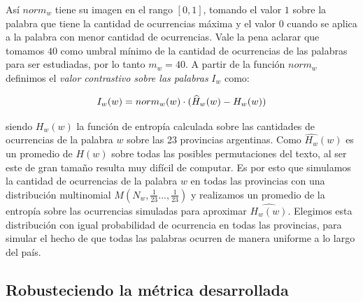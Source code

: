 Así $norm_w$ tiene su imagen en el rango $[0,1]$, tomando el valor $1$ sobre la palabra que tiene la cantidad de ocurrencias máxima y el valor $0$ cuando se aplica a la palabra con menor cantidad de ocurrencias. Vale la pena aclarar que tomamos $40$ como umbral mínimo de la cantidad de ocurrencias de las palabras para ser estudiadas, por lo tanto $m_w = 40 $.
A partir de la función $norm_w$ definimos el \textit{valor contrastivo sobre las palabras} $I_w$ como:


\begin{equation}
I_w(w) = norm_{w}(w) \cdot (\widehat{H}_{w}(w) - H_{w}(w)) \\
\label{eq:iw}
\end{equation}


\noindent siendo $H_w(w)$ la función de entropía calculada sobre las cantidades de ocurrencias de la palabra $w$ sobre las 23 provincias argentinas. Como $\widehat{H_w}(w)$ es un promedio de $H(w)$ sobre todas las posibles permutaciones del texto, al ser este de gran tamaño resulta muy difícil de computar. Es por esto que simulamos la cantidad de ocurrencias de la palabra $w$ en todas las provincias con una distribución multinomial $M(N_w,\frac{1}{23}\ldots,\frac{1}{23})$ y realizamos un promedio de la entropía sobre las ocurrencias simuladas para aproximar $\widehat{H_w(w)}$. Elegimos esta distribución con igual probabilidad de ocurrencia en todas las provincias, para simular el hecho de que todas las palabras ocurren de manera uniforme a lo largo del país.

\subsection{Robusteciendo la métrica desarrollada}

